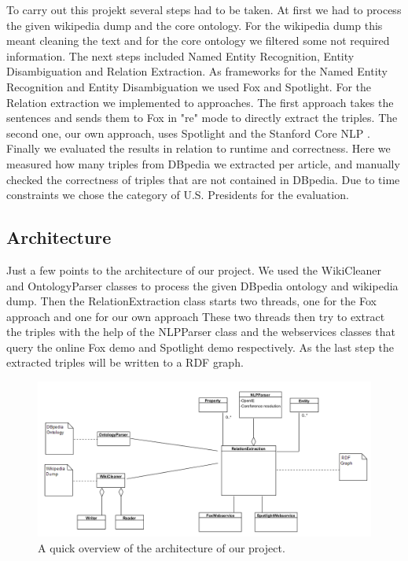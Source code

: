 \documentclass[runningheads]{llncs}
\begin{document}
To carry out this projekt several steps had to be taken. At first we had to process the given wikipedia dump and the core ontology. For the wikipedia dump this meant cleaning the text and for the core ontology we filtered some not required information. The next steps included Named Entity Recognition, Entity Disambiguation and Relation Extraction.
As frameworks for the Named Entity Recognition and Entity Disambiguation we used Fox and Spotlight. For the Relation extraction we implemented to approaches. The first approach takes the sentences and sends them to Fox in "re" mode to directly extract the triples. The second one, our own approach, uses Spotlight and the Stanford Core NLP \cite{stanford}. Finally we evaluated the results in relation to runtime and correctness. Here we measured how many triples from DBpedia we extracted per article, and manually checked the correctness of triples that are not contained in DBpedia. Due to time constraints we chose the category of U.S. Presidents for the evaluation.

\subsection{Architecture}
Just a few points to the architecture of our project. We used the WikiCleaner and OntologyParser classes to process the given DBpedia ontology and wikipedia dump. Then the RelationExtraction class starts two threads, one for the Fox approach and one for our own approach These two threads then try to extract the triples with the help of the NLPParser class and the webservices classes that query the online Fox demo and Spotlight demo respectively. As the last step the extracted triples will be written to a RDF graph.

\begin{figure}
\includegraphics[width=\textwidth]{architecture.png}
\caption{A quick overview of the architecture of our project.} \label{fig1}
\end{figure}
\end{document}
